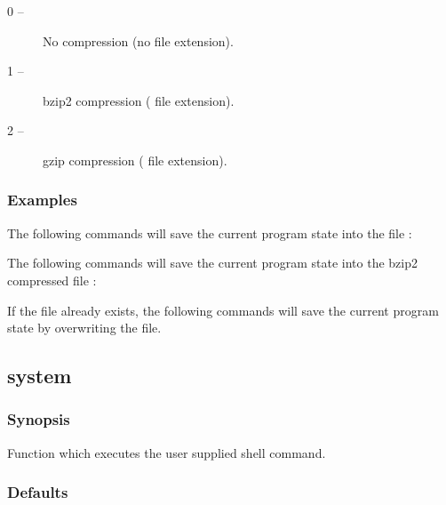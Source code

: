 \begin{description}
\item[    0 --]   No compression (no file extension).
\item[    1 --]   bzip2 compression (
 file extension).
\item[    2 --]   gzip compression (
 file extension).
\end{description}


\subsubsection{Examples}

The following commands will save the current program state into the file 
:





The following commands will save the current program state into the bzip2 compressed file
:







If the file 
 already exists, the following commands will save the current program
state by overwriting the file.





\newpage

\subsection{system}


\subsubsection{Synopsis}

Function which executes the user supplied shell command.

\subsubsection{Defaults}

